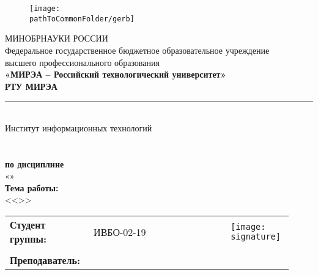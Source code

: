 
\begin{center}
	\begin{figure}[h!]
		\begin{center}
		\texttt{[image: \\pathToCommonFolder/gerb]}
		\end{center}	
	\end{figure}
 	\small	МИНОБРНАУКИ РОССИИ \\
	Федеральное государственное бюджетное образовательное учреждение\\
						высшего профессионального образования\\
\normalsize					
\textbf{«МИРЭА – Российский технологический университет»\\
						РТУ МИРЭА}\\
						\noindent\rule{1\linewidth}{2pt}\\
       Институт информационных технологий\\ %
					\kafedra\\
		\vspace{3ex}
			\large \textbf{\workname}  \\
						\textbf{по дисциплине}\\ «\discipline» \\
		\vspace{3ex}
		\textbf{Тема работы:}\\ <<\theme>>
\vspace{3ex}
\small
\begin{table}[h!]
\begin{tabular}{p{0.26\linewidth}p{0.28\linewidth}p{0.18\linewidth}p{0.2\linewidth}}
	\textbf{Студент группы:} &  ИВБО-02-19 &\studentfio &\texttt{[image: \\signature]}  \\\\
	\textbf{Преподаватель:} & \rang &\teacherfio &  \\
\end{tabular}
\end{table}
\end{center}

